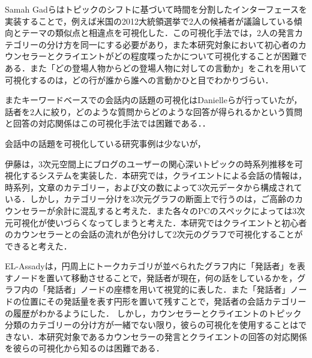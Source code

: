 \documentclass[shuuron]{kuee}
\begin{document}
Samah Gadら\cite{gad2015themedelta}はトピックのシフトに基づいて時間を分割したインターフェースを実装することで，例えば米国の2012大統領選挙で2人の候補者が議論している傾向とテーマの類似点と相違点を可視化した．この可視化手法では，2人の発言カテゴリーの分け方を同一にする必要があり，また本研究対象において初心者のカウンセラーとクライエントがどの程度喋ったかについて可視化することが困難である．また「どの登場人物からどの登場人物に対しての言動か」をこれを用いて可視化するのは，どの行が誰から誰への言動かひと目でわかりづらい．

またキーワードベースでの会話内の話題の可視化はDanielleら\cite{angus2012conceptual}が行っていたが，話者を2人に絞り，どのような質問からどのような回答が得られるかという質問と回答の対応関係はこの可視化手法では困難である．．%

会話中の話題を可視化している研究事例は少ないが，

伊藤\cite{itoh2010interactive}は，3次元空間上にブログのユーザーの関心深いトピックの時系列推移を可視化するシステムを実装した．本研究では，クライエントによる会話の情報は，時系列，文章のカテゴリー，および文の数によって3次元データから構成されている．しかし，カテゴリー分けを3次元グラフの断面上で行うのは，ご高齢のカウンセラーが余計に混乱すると考えた．また各々のPCのスペックによっては3次元可視化が使いづらくなってしまうと考えた．本研究ではクライエントと初心者のカウンセラーとの会話の流れが色分けして2次元のグラフで可視化することができると考えた．%

EL-Assady\cite{el2016contovi}は，円周上にトークカテゴリが並べられたグラフ内に「発話者」を表すノードを置いて移動させることで，発話者が現在，何の話をしているかを，グラフ内の「発話者」ノードの座標を用いて視覚的に表した．また「発話者」ノードの位置にその発話量を表す円形を置いて残すことで，発話者の会話カテゴリーの履歴がわかるようにした．
しかし，カウンセラーとクライエントのトピック分類のカテゴリーの分け方が一緒でない限り，彼らの可視化を使用することはできない．本研究対象であるカウンセラーの発言とクライエントの回答の対応関係を彼らの可視化から知るのは困難である．
\end{document}
